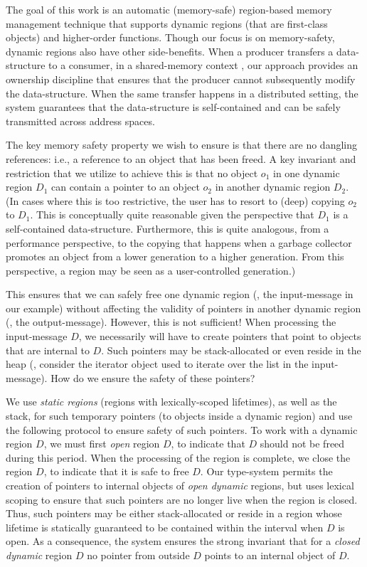 The goal of this work is an automatic (memory-safe) region-based memory management technique
that supports dynamic regions (that are first-class objects) and higher-order functions.
Though our focus is on memory-safety, dynamic regions also have other side-benefits.
When a producer transfers a data-structure to a consumer, in a shared-memory context , our approach
provides an ownership discipline that ensures that the producer cannot subsequently modify
the data-structure. When the same transfer happens in a distributed setting, the system guarantees
that the data-structure is self-contained and can be safely transmitted across address spaces.

The key memory safety property we wish to ensure is that there are no dangling references:
i.e., a reference to an object that has been freed.
A key invariant and restriction that we utilize to achieve this is that no object $o_1$ in one dynamic
region $D_1$ can contain a pointer to an object $o_2$ in another dynamic region $D_2$.
(In cases where this is too restrictive, the user has to resort to (deep) copying $o_2$ to $D_1$.
This is conceptually quite reasonable given the perspective that $D_1$ is a self-contained data-structure.
Furthermore, this is quite analogous, from a performance perspective, to the copying that happens
when a garbage collector promotes an object from a lower generation to a higher generation.
From this perspective, a region may be seen as a user-controlled generation.)

This ensures that we can safely free one dynamic region (\eg, the input-message in our example)
without affecting the validity of pointers in another dynamic region (\eg, the output-message).
However, this is not sufficient! When processing the input-message $D$, we necessarily will have to create
pointers that point to objects that are internal to $D$. Such pointers may be stack-allocated or even reside
in the heap (\eg, consider the iterator object used to iterate over the list in the input-message).
How do we ensure the safety of these pointers?

We use \emph{static regions} (regions with lexically-scoped lifetimes), as well as the stack,
for such temporary pointers (to objects inside a dynamic region) and use the following protocol
to ensure safety of such pointers.
To work with a dynamic region $D$, we must first \emph{open} region $D$,
to indicate that $D$ should not be freed during this period.
When the processing of the region is complete, we close the region $D$,
to indicate that it is safe to free $D$.
Our type-system permits the creation of pointers to internal objects of \emph{open dynamic} regions,
but uses lexical scoping to ensure that such pointers are no longer live when the region is closed.
Thus, such pointers may be either stack-allocated or reside in a region whose lifetime is statically
guaranteed to be contained within the interval when $D$ is open.
As a consequence, the system ensures the strong invariant that for a \emph{closed dynamic} region $D$
no pointer from outside $D$ points to an internal object of $D$.

